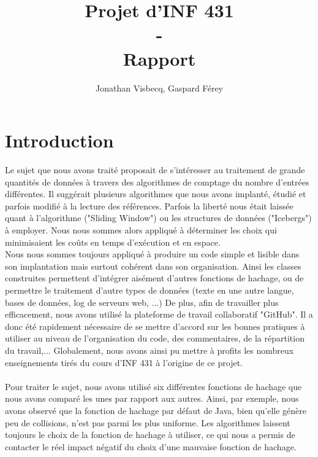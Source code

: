 \documentclass[12pt,a4paper,titlepage]{article}
\author{Jonathan Visbecq, Gaspard Férey}
\title{Projet d'INF 431 \\ - \\ Rapport}
\begin{document}
\maketitle

\tableofcontents
\newpage

\section*{Introduction}

Le sujet que nous avons traité proposait de s'intéresser au traitement de grande quantités de données à travers des algorithmes de comptage du nombre d'entrées différentes. Il suggérait plusieurs algorithmes que nous avons implanté, étudié et parfois modifié à la lecture des références. Parfois la liberté nous était laissée quant à l'algorithme ("Sliding Window") ou les structures de données ("Icebergs") à employer. Nous nous sommes alors appliqué à déterminer les choix qui minimisaient les coûts en temps d'exécution et en espace.\\

Nous nous sommes toujours appliqué à produire un code simple et lisible dans son implantation mais surtout cohérent dans son organisation. Ainsi les classes construites permettent d'intégrer aisément d'autres fonctions de hachage, ou de permettre le traitement d'autre types de données (texte en une autre langue, bases de données, log de serveurs web, ...) De plus, afin de travailler plus efficacement, nous avons utilisé la plateforme de travail collaboratif "GitHub". Il a donc été rapidement nécessaire de se mettre d'accord sur les bonnes pratiques à utiliser au niveau de l'organisation du code, des commentaires, de la répartition du travail,... Globalement, nous avons ainsi pu mettre à profits les nombreux enseignements tirés du cours d'INF 431 à l'origine de ce projet.\\
\\

Pour traiter le sujet, nous avons utilisé six différentes fonctions de hachage que nous avons comparé les unes par rapport aux autres. Ainsi, par exemple, nous avons observé que la fonction de hachage par défaut de Java, bien qu'elle génère peu de collisions, n'est pas parmi les plus uniforme. Les algorithmes laissent toujours le choix de la fonction de hachage à utiliser, ce qui nous a permis de contacter le réel impact négatif du choix d'une mauvaise fonction de hachage.\\
\end{document}
